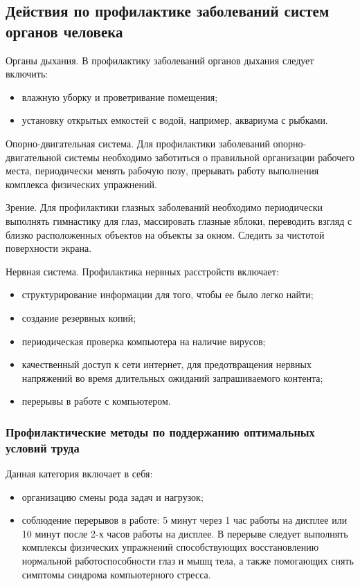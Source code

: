 \subsection{Действия по профилактике заболеваний систем органов человека}
Органы дыхания. В профилактику заболеваний органов дыхания следует включить:
\begin{itemize}
\item влажную уборку и проветривание помещения;
\item установку открытых емкостей с водой, например, аквариума с рыбками.
\end{itemize}

Опорно-двигательная система. Для профилактики заболеваний опорно-двигательной системы необходимо заботиться о правильной организации рабочего места, периодически менять рабочую позу, прерывать работу выполнения комплекса физических упражнений.

Зрение. Для профилактики глазных заболеваний необходимо периодически выполнять гимнастику для глаз, массировать глазные яблоки, переводить взгляд с близко расположенных объектов на объекты за окном. Следить за чистотой поверхности экрана.

Нервная система. Профилактика нервных расстройств включает:
\begin{itemize}
\item структурирование информации для того, чтобы ее было легко найти;
\item создание резервных копий;
\item периодическая проверка компьютера на наличие вирусов;
\item качественный доступ к сети интернет,  для предотвращения нервных напряжений во время длительных ожиданий запрашиваемого контента;
\item перерывы в работе с компьютером.
\end{itemize}

\subsubsection{Профилактические методы по поддержанию оптимальных условий труда}
Данная категория включает в себя:
\begin{itemize}
\item организацию смены рода задач и нагрузок;
\item соблюдение  перерывов в работе: 5 минут через 1 час работы на дисплее или 10 минут после 2-х часов работы на дисплее. В перерыве следует выполнять комплексы физических упражнений способствующих восстановлению нормальной работоспособности глаз и мышц тела, а также помогающих снять симптомы синдрома компьютерного стресса.
\end{itemize}

